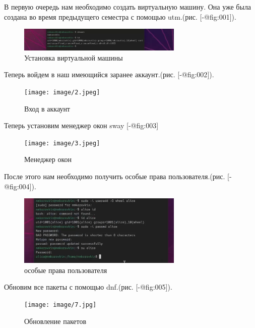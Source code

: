 В первую очередь нам необходимо создать виртуальную машину. Она уже была
создана во время предыдущего семестра с помощью utm.(рис.
{[}-@fig:001{]}).

\begin{figure}
\hypertarget{fig:001}{%
\centering
\includegraphics[width=0.7\textwidth,height=\textheight]{image/1.png}
\caption{Установка виртуальной машины}\label{fig:001}
}
\end{figure}

Теперь войдем в наш имеющийся заранее аккаунт.(рис. {[}-@fig:002{]}).

\begin{figure}
\hypertarget{fig:002}{%
\centering
\texttt{[image: image/2.jpeg]}
\caption{Вход в аккаунт}\label{fig:002}
}
\end{figure}

Теперь установим менеджер окон sway {[}-@fig:003{]}

\begin{figure}
\hypertarget{fig:003}{%
\centering
\texttt{[image: image/3.jpeg]}
\caption{Менеджер окон}\label{fig:003}
}
\end{figure}

После этого нам необходимо получить особые права пользователя.(рис.
{[}-@fig:004{]}).

\begin{figure}
\hypertarget{fig:004}{%
\centering
\includegraphics[width=0.7\textwidth,height=\textheight]{image/5.png}
\caption{особые права пользователя}\label{fig:004}
}
\end{figure}

Обновим все пакеты с помощью dnf.(рис. {[}-@fig:005{]}).

\begin{figure}
\hypertarget{fig:005}{%
\centering
\texttt{[image: image/7.jpg]}
\caption{Обновление пакетов}\label{fig:005}
}
\end{figure}

